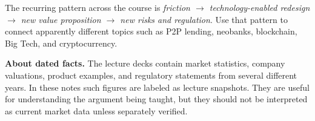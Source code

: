 \begin{mlfigure}
\end{mlfigure}

\begin{keyidea}
The recurring pattern across the course is \emph{friction $\rightarrow$ technology-enabled redesign $\rightarrow$ new value proposition $\rightarrow$ new risks and regulation}. Use that pattern to connect apparently different topics such as P2P lending, neobanks, blockchain, Big Tech, and cryptocurrency.
\end{keyidea}

\begin{libnote}
\textbf{About dated facts.} The lecture decks contain market statistics, company valuations, product examples, and regulatory statements from several different years. In these notes such figures are labeled as lecture snapshots. They are useful for understanding the argument being taught, but they should not be interpreted as current market data unless separately verified.
\end{libnote}
